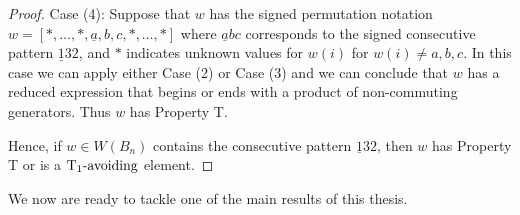 \begin{lemma}
\begin{proof}
	Case (4): Suppose that $w$ has the signed permutation notation $w=[\ast, \ldots, \ast, \underline{a},b,c, \ast, \ldots, \ast]$ where $\underline{a}bc$ corresponds to the signed consecutive pattern $\underline{1}32$, and $\ast$ indicates unknown values for $w(i)$ for $w(i)\neq a,b,c$. In this case we can apply either Case (2) or Case (3) and we can conclude that $w$ has a reduced expression that begins or ends with a product of non-commuting generators. Thus $w$ has Property T.
	
	Hence, if $w \in W(B_n)$ contains the consecutive pattern $\underline{1}32$, then $w$ has Property T or is a $\operatorname{T_1-\mathrm{avoiding}}$ element.
\end{proof}	
\end{lemma}

We now are ready to tackle one of the main results of this thesis.

